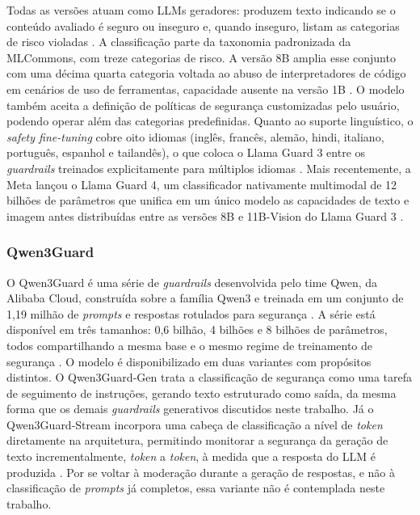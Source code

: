 Todas as versões atuam como LLMs geradores: produzem texto indicando se o conteúdo avaliado é seguro ou inseguro e, quando inseguro, listam as categorias de risco violadas \cite{llamaguard3hf, llamaguard31bhf}. A classificação parte da taxonomia padronizada da MLCommons, com treze categorias de risco. A versão 8B amplia esse conjunto com uma décima quarta categoria voltada ao abuso de interpretadores de código em cenários de uso de ferramentas, capacidade ausente na versão 1B \cite{llamaguard3hf, llamaguard31bhf}. O modelo também aceita a definição de políticas de segurança customizadas pelo usuário, podendo operar além das categorias predefinidas. Quanto ao suporte linguístico, o \textit{safety fine-tuning} cobre oito idiomas (inglês, francês, alemão, hindi, italiano, português, espanhol e tailandês), o que coloca o Llama Guard 3 entre os \textit{guardrails} treinados explicitamente para múltiplos idiomas \cite{llamaguard3hf, llamaguard31bhf}.
Mais recentemente, a Meta lançou o Llama Guard 4, um classificador nativamente multimodal de 12 bilhões de parâmetros que unifica em um único modelo as capacidades de texto e imagem antes distribuídas entre as versões 8B e 11B-Vision do Llama Guard 3 \cite{llamaguard4hf}.

\subsubsection{Qwen3Guard}
\label{subsec:qwen3guard}

O Qwen3Guard é uma série de \textit{guardrails} desenvolvida pelo time Qwen, da Alibaba Cloud, construída sobre a família Qwen3 e treinada em um conjunto de 1,19 milhão de \textit{prompts} e respostas rotulados para segurança \cite{qwen3guardhf, zhao2025qwen3guard}. A série está disponível em três tamanhos: 0,6 bilhão, 4 bilhões e 8 bilhões de parâmetros, todos compartilhando a mesma base e o mesmo regime de treinamento de segurança \cite{qwen3guardhf}. O modelo é disponibilizado em duas variantes com propósitos distintos. O Qwen3Guard-Gen trata a classificação de segurança como uma tarefa de seguimento de instruções, gerando texto estruturado como saída, da mesma forma que os demais \textit{guardrails} generativos discutidos neste trabalho. Já o Qwen3Guard-Stream incorpora uma cabeça de classificação a nível de \textit{token} diretamente na arquitetura, permitindo monitorar a segurança da geração de texto incrementalmente, \textit{token} a \textit{token}, à medida que a resposta do LLM é produzida \cite{zhao2025qwen3guard}. Por se voltar à moderação durante a geração de respostas, e não à classificação de \textit{prompts} já completos, essa variante não é contemplada neste trabalho.

